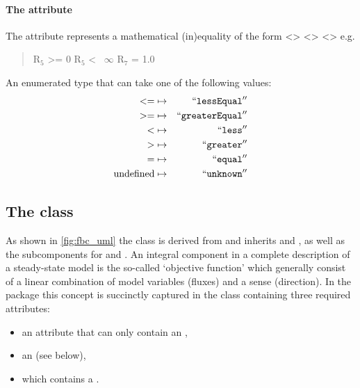 \paragraph{The  attribute}
The  attribute represents a mathematical (in)equality of the form <> <> <> e.g.
 \begin{quote}\center
 R$_{5}$ >= 0\newline 
 R$_{5}$ <~ $\infty$\newline 
 R$_{7}$ = 1.0\newline
\end{quote} 
An enumerated type that can take one of the following values:
\begin{eqnarray*}
\label{fb-operation-enum}
 \nonumber
  <= & \mapsto & ``\textcolor{black}{\textup{\ttfamily{lessEqual}}}''\\
  >= & \mapsto & ``\textcolor{black}{\textup{\ttfamily{greaterEqual}}}''\\
  < & \mapsto & ``\textcolor{black}{\textup{\ttfamily{less}}}''\\
  > & \mapsto & ``\textcolor{black}{\textup{\ttfamily{greater}}}''\\
  = & \mapsto & ``\textcolor{black}{\textup{\ttfamily{equal}}}''\\
  \textrm{undefined} & \mapsto & ``\textcolor{black}{\textup{\ttfamily{unknown}}}''
\end{eqnarray*}


\subsection{The \FBC {} class}
\label{objective-class}
\label{listoffluxobjectives-class}

As shown in \ref{fig:fbc_uml} the \FBC \Objective class is derived from \SBML \SBase and inherits  and , as well as the subcomponents for \Annotation and \Notes. An integral component in a complete description of a steady-state model is the so-called `objective function' which generally consist of a linear combination of model variables (fluxes) and a sense (direction). In the \FBC package this concept is succinctly captured in the \Objective class containing three required attributes:
\begin{itemize}
  \item {} an attribute that can only contain an ,
  \item {} an  (see below),
  \item {} which contains a \ListOfFluxObjectives.
\end{itemize}

